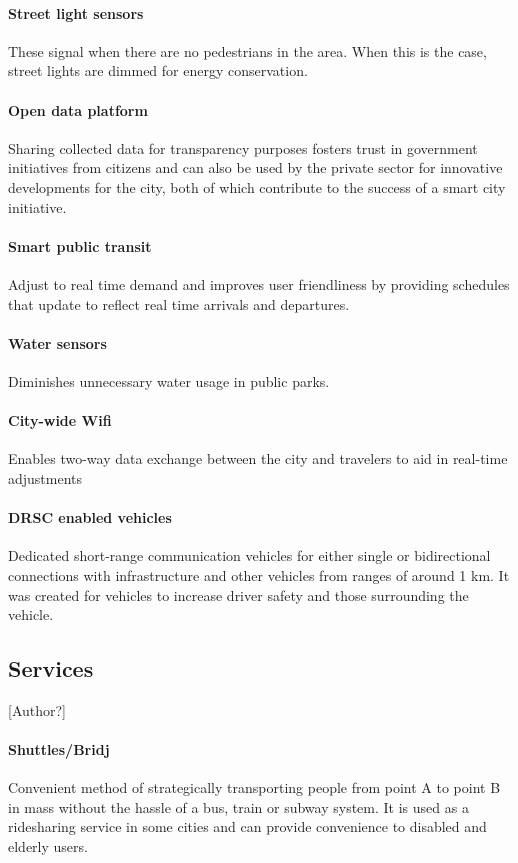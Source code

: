 \documentclass[12pt]{article}                         %
\begin{document}
\paragraph{Street light sensors} These signal when there are no pedestrians in the area. When this is the case, street lights are dimmed for energy conservation.

\paragraph{Open data platform} Sharing collected data for transparency purposes fosters trust in government initiatives from citizens and can also be used by the private sector for innovative developments for the city, both of which contribute to the success of a smart city initiative.

\paragraph{Smart public transit} Adjust to real time demand and improves user friendliness by providing schedules that update to reflect real time arrivals and departures. 

\paragraph{Water sensors} Diminishes unnecessary water usage in public parks.

\paragraph{City-wide Wifi} Enables two-way data exchange between the city and travelers to aid in real-time adjustments

\paragraph{DRSC enabled vehicles} Dedicated short-range communication vehicles for either single or bidirectional connections with infrastructure and other vehicles from ranges of around 1 km. It was created for vehicles to increase driver safety and those surrounding the vehicle.

\subsection{Services}[Author?]
\paragraph{Shuttles/Bridj} Convenient method of strategically transporting people from point A to point B in mass without the hassle of a bus, train or subway system. It is used as a ridesharing service in some cities and can provide convenience to disabled and elderly users.
\end{document}
